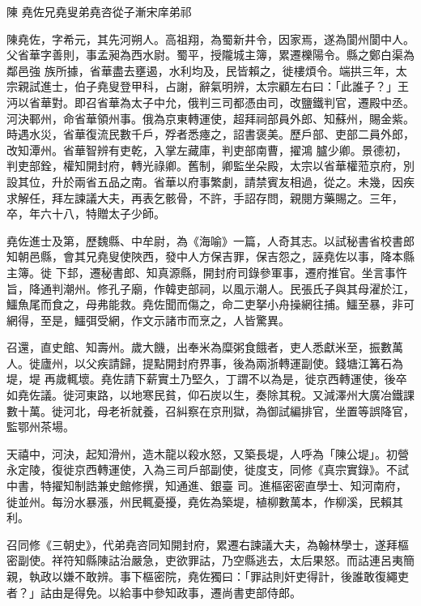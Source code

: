 
\begin{pinyinscope}

 陳
 堯佐兄堯叟弟堯咨從子漸宋庠弟祁



 陳堯佐，字希元，其先河朔人。高祖翔，為蜀新井令，因家焉，遂為閬州閬中人。父省華字善則，事孟昶為西水尉。蜀平，授隴城主簿，累遷櫟陽令。縣之鄭白渠為鄰邑強
 族所據，省華盡去壅遏，水利均及，民皆賴之，徙樓煩令。端拱三年，太宗親試進士，伯子堯叟登甲科，占謝，辭氣明辨，太宗顧左右曰：「此誰子？」王沔以省華對。即召省華為太子中允，俄判三司都憑由司，改鹽鐵判官，遷殿中丞。河決鄆州，命省華領州事。俄為京東轉運使，超拜祠部員外郎、知蘇州，賜金紫。時遇水災，省華復流民數千戶，殍者悉瘞之，詔書褒美。歷戶部、吏部二員外郎，改知潭州。省華智辨有吏乾，入掌左藏庫，判吏部南曹，擢鴻
 臚少卿。景德初，判吏部銓，權知開封府，轉光祿卿。舊制，卿監坐朵殿，太宗以省華權蒞京府，別設其位，升於兩省五品之南。省華以府事繁劇，請禁賓友相過，從之。未幾，因疾求解任，拜左諫議大夫，再表乞骸骨，不許，手詔存問，親閱方藥賜之。三年，卒，年六十八，特贈太子少師。



 堯佐進士及第，歷魏縣、中牟尉，為《海喻》一篇，人奇其志。以試秘書省校書郎知朝邑縣，會其兄堯叟使陜西，發中人方保吉罪，保吉怨之，誣堯佐以事，降本縣主簿。徙
 下邽，遷秘書郎、知真源縣，開封府司錄參軍事，遷府推官。坐言事忤旨，降通判潮州。修孔子廟，作韓吏部祠，以風示潮人。民張氏子與其母濯於江，鱷魚尾而食之，母弗能救。堯佐聞而傷之，命二吏拏小舟操網往捕。鱷至暴，非可網得，至是，鱷弭受網，作文示諸市而烹之，人皆驚異。



 召還，直史館、知壽州。歲大饑，出奉米為糜粥食餓者，吏人悉獻米至，振數萬人。徙廬州，以父疾請歸，提點開封府界事，後為兩浙轉運副使。錢塘江篝石為堤，堤
 再歲輒壞。堯佐請下薪實土乃堅久，丁謂不以為是，徙京西轉運使，後卒如堯佐議。徙河東路，以地寒民貧，仰石炭以生，奏除其稅。又減澤州大廣冶鐵課數十萬。徙河北，母老祈就養，召糾察在京刑獄，為御試編排官，坐置等誤降官，監鄂州茶場。



 天禧中，河決，起知滑州，造木龍以殺水怒，又築長堤，人呼為「陳公堤」。初營永定陵，復徙京西轉運使，入為三司戶部副使，徙度支，同修《真宗實錄》。不試中書，特擢知制誥兼史館修撰，知通進、銀臺
 司。進樞密密直學士、知河南府，徙並州。每汾水暴漲，州民輒憂擾，堯佐為築堤，植柳數萬本，作柳溪，民賴其利。



 召同修《三朝史》，代弟堯咨同知開封府，累遷右諫議大夫，為翰林學士，遂拜樞密副使。祥符知縣陳詁治嚴急，吏欲罪詁，乃空縣逃去，太后果怒。而詁連呂夷簡親，執政以嫌不敢辨。事下樞密院，堯佐獨曰：「罪詁則奸吏得計，後誰敢復繩吏者？」詁由是得免。以給事中參知政事，遷尚書吏部侍郎。




\end{pinyinscope}
